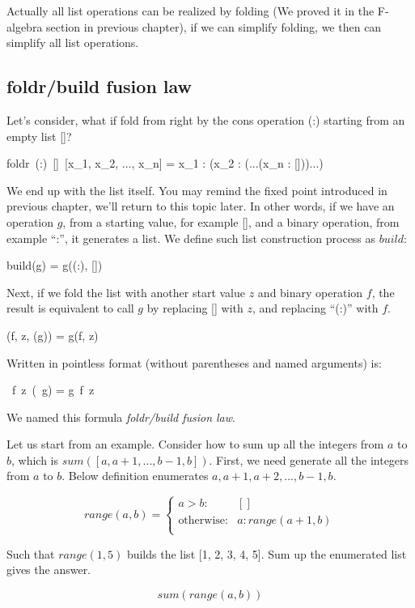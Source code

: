 \documentclass{article}
\begin{document}
Actually all list operations can be realized by folding (We proved it in the F-algebra section in previous chapter), if we can simplify folding, we then can simplify all list operations.

\subsection{foldr/build fusion law}
Let's consider, what if fold from right by the cons operation (:) starting from an empty list []?

\be
foldr\ (:)\ []\ [x_1, x_2, ..., x_n] = x_1 : (x_2 : (...(x_n : []))...)
\label{eq:foldr-fixed-point}
\ee

We end up with the list itself. You may remind the fixed point introduced in previous chapter, we'll return to this topic later. In other words, if we have an operation $g$, from a starting value, for example [], and a binary operation, from example ``:'', it generates a list. We define such list construction process as $build$:

\be
build(g) = g((:), [])
\label{eq:build-definition}
\ee

Next, if we fold the list with another start value $z$ and binary operation $f$, the result is equivalent to call $g$ by replacing [] with $z$, and replacing ``(:)'' with $f$.

\be
{}(f, z, (g)) = g(f, z)
\ee

Written in pointless format (without parentheses and named arguments) is:

\be
{}\ f\ z\ (\ g) = g\ f\ z
\label{eq:foldr-build-fusion-law}
\ee

We named this formula {\em foldr/build fusion law}.

Let us start from an example. Consider how to sum up all the integers from $a$ to $b$, which is $sum([a, a+1, ..., b-1, b])$. First, we need generate all the integers from $a$ to $b$. Below definition enumerates $a, a+1, a+2, ..., b-1, b$.

\[
range(a, b) =
\begin{cases}
a > b: & [] \\
\text{otherwise}: & a : range(a+1, b) \\
\end{cases}
\]

Such that $range(1, 5)$ builds the list [1, 2, 3, 4, 5]. Sum up the enumerated list gives the answer.

\[
sum(range(a, b))
\]
\end{document}
